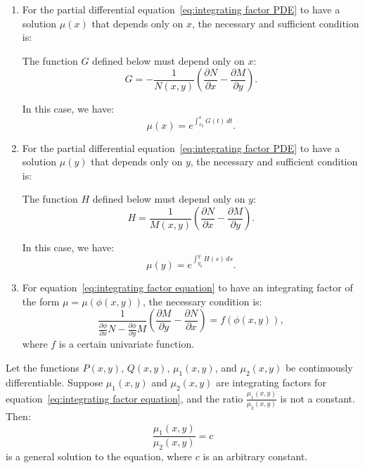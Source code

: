 \documentclass[11pt]{../../TexTemplate/elegantbook}
\begin{document}
\begin{theorem}
\begin{enumerate}
    \item For the partial differential equation~\ref{eq:integrating factor PDE} 
        to have a solution $\mu(x)$ that depends only on $x$, the necessary and sufficient condition is:

        The function $G$ defined below must depend only on $x$:
        \[
        G = -\frac{1}{N(x, y)}\left( \frac{\partial N}{\partial x} - \frac{\partial M}{\partial y} \right) .
        \]

        In this case, we have:
        \[
        \mu(x) = e^{\int_{x_0}^{x} G(t) \, dt}.
        \]
    
    \item 
        For the partial differential equation~\ref{eq:integrating factor PDE} 
        to have a solution $\mu(y)$ that depends only on $y$, 
        the necessary and sufficient condition is:

        The function $H$ defined below must depend only on $y$:
        \[
        H = \frac{1}{M(x, y)}\left( \frac{\partial N}{\partial x} - \frac{\partial M}{\partial y} \right) .
        \]

        In this case, we have:
        \[
        \mu(y) = e^{\int_{y_0}^{y} H(s) \, ds}.
        \]

    \item 
        For equation~\ref{eq:integrating factor equation} to have an integrating factor of the form 
        $\mu = \mu(\phi(x, y))$, the necessary condition is:
        \[
        \frac{1}{\frac{\partial \phi}{\partial x} N - \frac{\partial \phi}{\partial y} M} 
        \left( \frac{\partial M}{\partial y} - \frac{\partial N}{\partial x} \right) 
        = f(\phi(x, y)),
        \]
        where \(f\) is a certain univariate function.
\end{enumerate}
\end{theorem}


\begin{theorem}
    Let the functions \(P(x, y)\), \(Q(x, y)\), \(\mu_1(x, y)\), and \(\mu_2(x, y)\) be continuously differentiable. 
    Suppose \(\mu_1(x, y)\) and \(\mu_2(x, y)\) are integrating factors for equation~\eqref{eq:integrating factor equation}, 
    and the ratio \(\frac{\mu_1(x, y)}{\mu_2(x, y)}\) is not a constant. 
    Then: 
    \[
    \frac{\mu_1(x, y)}{\mu_2(x, y)} = c
    \]
    is a general solution to the equation, where \(c\) is an arbitrary constant.
\end{theorem}
\end{document}
